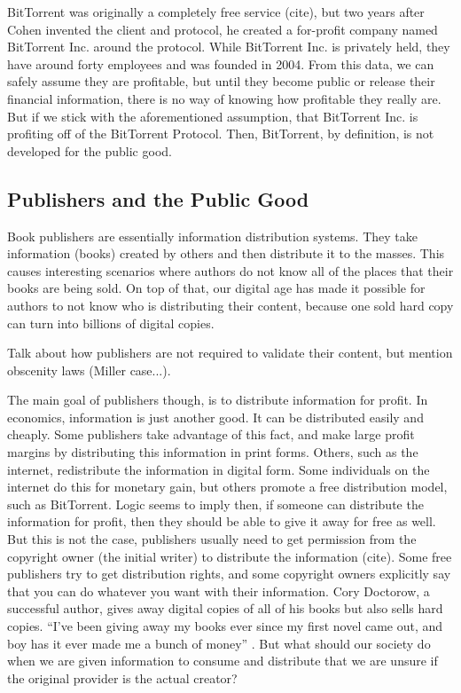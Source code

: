 \documentclass[11pt]{article}
\begin{document}
BitTorrent was originally a completely free service (cite), but two years after Cohen invented the client and protocol, he created a for-profit company named BitTorrent Inc. around the protocol. While BitTorrent Inc. is privately held, they have around forty employees and was founded in 2004. From this data, we can safely assume they are profitable, but until they become public or release their financial information, there is no way of knowing how profitable they really are. But if we stick with the aforementioned assumption, that BitTorrent Inc. is profiting off of the BitTorrent Protocol. Then, BitTorrent, by definition, is not developed for the public good.

\subsection{Publishers and the Public Good}

Book publishers are essentially information distribution systems. They take information (books) created by others and then distribute it to the masses. This causes interesting scenarios where authors do not know all of the places that their books are being sold. On top of that, our digital age has made it possible for authors to not know who is distributing their content, because one sold hard copy can turn into billions of digital copies.

Talk about how publishers are not required to validate their content, but mention obscenity laws (Miller case...).

The main goal of publishers though, is to distribute information for profit. In economics, information is just another good. It can be distributed easily and cheaply. Some publishers take advantage of this fact, and make large profit margins\cite{PSO} by distributing this information in print forms. Others, such as the internet, redistribute the information in digital form. Some individuals on the internet do this for monetary gain, but others promote a free distribution model, such as BitTorrent. Logic seems to imply then, if someone can distribute the information for profit, then they should be able to give it away for free as well. But this is not the case, publishers usually need to get permission from the copyright owner (the initial writer) to distribute the information (cite). Some free publishers try to get distribution rights, and some copyright owners explicitly say that you can do whatever you want with their information. Cory Doctorow, a successful author, gives away digital copies of all of his books but also sells hard copies. ``I've been giving away my books ever since my first novel came out, and boy has it ever made me a bunch of money'' \cite{doctorow}. But what should our society do when we are given information to consume and distribute that we are unsure if the original provider is the actual creator?
\end{document}
